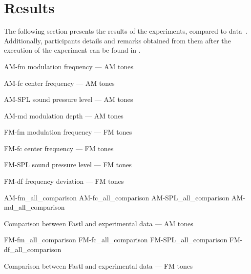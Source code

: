\documentclass[../main.tex]{subfiles}
\begin{document}
\section{Results}

The following section presents the results of the experiments, compared to
\citeauthor{Fastl2007Psychoacoustics} data~\cite{Fastl2007Psychoacoustics}.
Additionally, participants details and remarks obtained from them after the
execution of the experiment can be found in .

\begin{experimentalresults}

\myfigurefastlexpstds%
  {AM-fm}
  {modulation frequency --- AM tones}

\myfigurefastlexpstds%
  {AM-fc}
  {center frequency --- AM tones}

\myfigurefastlexpstds%
  {AM-SPL}
  {sound pressure level --- AM tones}

\myfigurefastlexpstds%
  {AM-md}
  {modulation depth --- AM tones}

\myfigurefastlexpstds%
  {FM-fm}
  {modulation frequency --- FM tones}

\myfigurefastlexpstds%
  {FM-fc}
  {center frequency --- FM tones}

\myfigurefastlexpstds%
  {FM-SPL}
  {sound pressure level --- FM tones}

\myfigurefastlexpstds%
  {FM-df}
  {frequency deviation --- FM tones}

\myfigurequad%
  {AM-fm_all_comparison}
  {AM-fc_all_comparison}
  {AM-SPL_all_comparison}
  {AM-md_all_comparison}
  {
    \caption{Comparison between Fastl and experimental data --- AM tones}
    \label{fig:am_comparison}
  }

\myfigurequad%
  {FM-fm_all_comparison}
  {FM-fc_all_comparison}
  {FM-SPL_all_comparison}
  {FM-df_all_comparison}
  {
    \caption{Comparison between Fastl and experimental data --- FM tones}
    \label{fig:fm_comparison}
  }

\end{experimentalresults}
\end{document}
